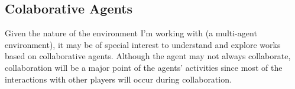 \subsection{Colaborative Agents}
Given the nature of the environment I'm working with (a multi-agent environment), it may be of special interest to understand and explore works based on collaborative agents.
Although the agent may not always collaborate, collaboration will be a major point of the agents' activities since most of the interactions with other players will occur during collaboration.
